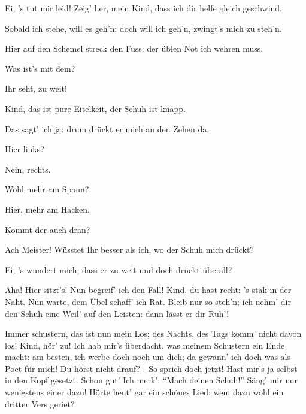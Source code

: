 \begin{drama}
\Sachsspeaks
Ei, 's tut mir leid!
Zeig' her, mein Kind,
dass ich dir helfe gleich geschwind.

\Evaspeaks
Sobald ich stehe,
will es geh'n;
doch will ich geh'n,
zwingt's mich zu steh'n.

\Sachsspeaks
Hier auf den Schemel streck den Fuss:
der üblen Not ich wehren muss.


Was ist's mit dem?

\Evaspeaks
Ihr seht, zu weit!

\Sachsspeaks
Kind, das ist pure Eitelkeit,
der Schuh ist knapp.

\Evaspeaks
Das sagt' ich ja:
drum drückt er mich an den Zehen da.

\Sachsspeaks
Hier links?

\Evaspeaks
Nein, rechts.

\Sachsspeaks
Wohl mehr am Spann?

\Evaspeaks
Hier, mehr am Hacken.

\Sachsspeaks
Kommt der auch dran?

\Evaspeaks
Ach Meister! Wüsstet Ihr besser als ich,
wo der Schuh mich drückt?

\Sachsspeaks
Ei, 's wundert mich,
dass er zu weit und doch drückt überall?


Aha! Hier sitzt's! Nun begreif' ich den Fall!
Kind, du hast recht:
's stak in der Naht.
Nun warte, dem Übel schaff' ich Rat.
Bleib nur so steh'n; ich nehm' dir den Schuh
eine Weil' auf den Leisten:
dann lässt er dir Ruh'!



\Sachsspeaks


Immer schustern, das ist nun mein Los;
des Nachts, des Tags komm' nicht davon los!
Kind, hör' zu! Ich hab mir's überdacht,
was meinem Schustern ein Ende macht:
am besten, ich werbe doch noch um dich;
da gewänn' ich doch was als Poet für mich!
Du hörst nicht drauf? - So sprich doch jetzt!
Hast mir's ja selbst in den Kopf gesetzt.
Schon gut! Ich merk':
``Mach deinen Schuh!''
Säng' mir nur wenigstens einer dazu!
Hörte heut' gar ein schönes Lied:
wem dazu wohl ein dritter Vers geriet?


\end{drama}
